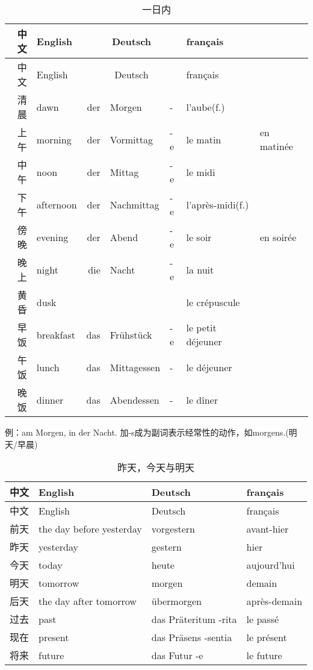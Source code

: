 \documentclass[12pt,A4paper,oneside,reqno]{amsart}
\numberwithin{equation}{section}
\theoremstyle{plain}
\theoremstyle{plain}
\theoremstyle{plain}
\numberwithin{equation}{section}
\theoremstyle{remark}
\begin{document}
\begin{longtable}{r|l|rll|l|l}
	\hline
中文	&	English	&	\multicolumn{3}{c|}{Deutsch}	&	français	&		\\
	\hline
	\endhead
	\hline
中文	&	English	&	\multicolumn{3}{c|}{Deutsch}	&	français	&		\\

	\hline
	\endfirsthead	
	\hline
	\endfoot
	\hline	
	\caption{一日内}
	\endlastfoot				
							
清晨	&	dawn	&	der	&	Morgen	&	-	&	l'aube(f.)	&		\\
上午	&	morning	&	der	&	Vormittag	&	-e	&	le matin	&	en matin\'{e}e	\\
中午	&	noon	&	der	&	Mittag	&	-e	&	le midi	&		\\
下午	&	afternoon	&	der	&	Nachmittag	&	-e	&	l'apr\`{e}s-midi(f.)	&		\\
傍晚	&	evening	&	der	&	Abend	&	-e	&	le soir	&	en soir\'{e}e	\\
晚上	&	night	&	die	&	Nacht	&	-e	&	la nuit	&		\\
黄昏	&	dusk	&		&		&		&	le cr\'{e}puscule	&		\\
\hline													
早饭	&	breakfast	&	das	&	Fr\"{u}hst\"{u}ck	&	-e	&	le petit d\'{e}jeuner	&		\\
午饭	&	lunch	&	das	&	Mittagessen	&	-	&	le d\'{e}jeuner	&		\\
晚饭	&	dinner	&	das	&	Abendessen	&	-	&	le d\^{i}ner	&		\\



	
\end{longtable}
例：am Morgen, in der Nacht. 加-s成为副词表示经常性的动作，如morgens.(明天/早晨)
\begin{longtable}{r|l|l|l}
	\hline
	中文	&	English	&	Deutsch	&	français			\\
	\hline
	\endhead
	\hline
	中文	&	English	&	Deutsch	&	français			\\
	
	\hline
	\endfirsthead	
	\hline
	\endfoot
	\hline	
	\caption{昨天，今天与明天}
	\endlastfoot				
前天	&	the day before yesterday	&	vorgestern	&	avant-hier	\\
昨天	&	yesterday	&	gestern	&	hier	\\
今天	&	today	&	heute	&	aujourd'hui	\\
明天	&	tomorrow	&	morgen	&	demain	\\
后天	&	the day after tomorrow	&	\"{u}bermorgen	&	apr\`{e}s-demain	\\
过去	&	past	&	das Pr\"{a}teritum -rita	&	le pass\'{e}	\\
现在	&	present	&	das Pr\"{a}sens -sentia	&	le pr\'{e}sent	\\
将来	&	future	&	das Futur -e	&	le future	\\

	
\end{longtable}
\end{document}
